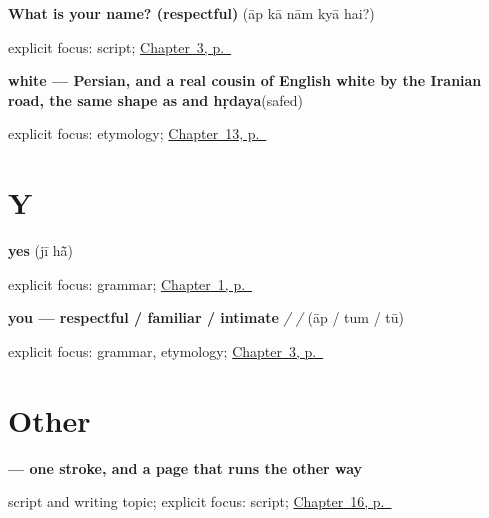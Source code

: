 \noindent\begin{minipage}[t]{\linewidth}
\raggedright
\textbf{What is your name? (respectful)}\enspace\emph{    }\enspace(āp kā nām kyā hai?)\par
\footnotesize explicit focus: script; \hyperref[ch:ur-ask-and-answer-names]{Chapter~3, p.~\pageref*{ch:ur-ask-and-answer-names}}
\end{minipage}\par\smallskip

\noindent\begin{minipage}[t]{\linewidth}
\raggedright
\textbf{white — Persian, and a real cousin of English white by the Iranian road, the same shape as  and hṛdaya}\enspace\emph{}\enspace(safed)\par
\footnotesize explicit focus: etymology; \hyperref[ch:ur-colors]{Chapter~13, p.~\pageref*{ch:ur-colors}}
\end{minipage}\par\smallskip

\section*{Y}

\noindent\begin{minipage}[t]{\linewidth}
\raggedright
\textbf{yes}\enspace\emph{ }\enspace(jī hā̃)\par
\footnotesize explicit focus: grammar; \hyperref[ch:urdu-greetings]{Chapter~1, p.~\pageref*{ch:urdu-greetings}}
\end{minipage}\par\smallskip

\noindent\begin{minipage}[t]{\linewidth}
\raggedright
\textbf{you — respectful / familiar / intimate}\enspace\emph{ /  / }\enspace(āp / tum / tū)\par
\footnotesize explicit focus: grammar, etymology; \hyperref[ch:ur-ask-and-answer-names]{Chapter~3, p.~\pageref*{ch:ur-ask-and-answer-names}}
\end{minipage}\par\smallskip

\section*{Other}

\noindent\begin{minipage}[t]{\linewidth}
\raggedright
\textbf{ — one stroke, and a page that runs the other way}\par
\footnotesize script and writing topic; explicit focus: script; \hyperref[ch:ur-script-seven]{Chapter~16, p.~\pageref*{ch:ur-script-seven}}
\end{minipage}\par\smallskip

